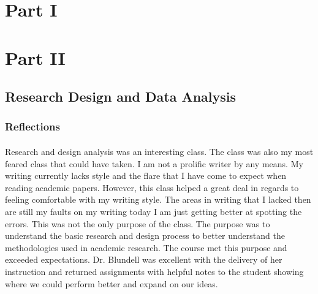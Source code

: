 \documentclass[12pt,titlepage]{article}
\begin{document}
\maketitle
\tableofcontents
\newpage
\section{Part I}





\section{Part II}
\subsection{Research Design and Data Analysis}
\subsubsection{Reflections}
\paragraph {}
Research and design analysis was an interesting class. The class was also my most feared class that could have taken. I am not a prolific writer by any means. My writing currently lacks style and the flare that I have come to expect when reading academic papers. However, this class helped a great deal in regards to feeling comfortable with my writing style. The areas in writing that I lacked then are still my faults on my writing today I am just getting better at spotting the errors. This was not the only purpose of the class. The purpose was to understand the basic research and design process to better understand the methodologies used in academic research. The course met this purpose and exceeded expectations. Dr. Blundell was excellent with the delivery of her instruction and returned assignments with helpful notes to the student showing where we could perform better and expand on our ideas.
\end{document}
